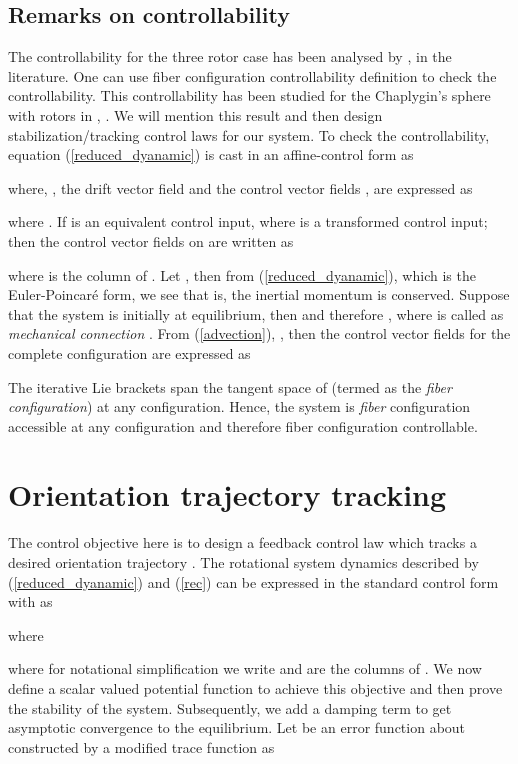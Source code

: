 \documentclass{ifacconf}
\begin{document}
\subsection*{Remarks on controllability}
The controllability for the three rotor case has been analysed by \cite{reg_n_chaotic_2013}, \cite{joshi_banavar} in the literature. One can use fiber configuration controllability definition to check the controllability. This controllability has been studied for the Chaplygin's sphere with rotors in \cite{shen2008}, \cite{karimpur_2012}. We will mention this result and then design stabilization/tracking control laws for our system. To check the controllability, equation (\ref{reduced_dyanamic}) is cast in an affine-control form as

where, , the drift vector field  and the control vector fields , are expressed as 

where . If   is an equivalent control input, where  is a transformed control input; then the control vector fields on  are written as 

where  is the  column of . Let , then from  (\ref{reduced_dyanamic}), which is the Euler-Poincar\'{e} form, we see 
that is, the inertial momentum  is conserved. Suppose that the system is initially at equilibrium, then  and therefore , where  is called as \textit{mechanical connection} \cite{schneider}. From (\ref{advection}), , then the control vector fields for the complete configuration  are expressed as 

The iterative Lie brackets  span the tangent space of  (termed as the \textit{fiber configuration}) at any configuration. Hence, the system is \textit{fiber} configuration accessible at any configuration and therefore fiber configuration controllable. 
\section{Orientation trajectory tracking}
The control objective here is to design a feedback control law which tracks a desired orientation trajectory .  The rotational system dynamics described by (\ref{reduced_dyanamic}) and (\ref{rec}) can be expressed in the standard control form with  as

where

where for notational simplification we write  and  are the columns of .
We now define a scalar valued potential function to achieve this objective and then prove the stability of the system. Subsequently, we add a damping term to get asymptotic convergence to the equilibrium. Let  be an error function about  constructed by a modified trace function as
\end{document}

